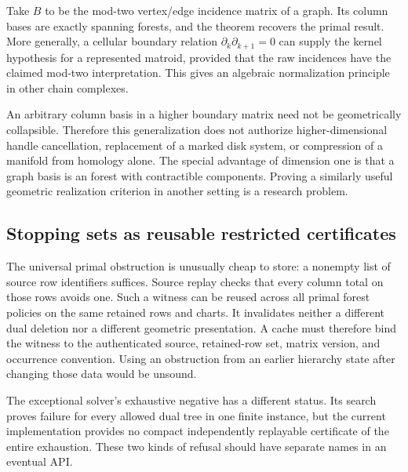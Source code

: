 Take $B$ to be the mod-two vertex/edge incidence matrix of a graph.  Its
column bases are exactly spanning forests, and the theorem recovers the
primal result.  More generally, a cellular boundary relation
$\partial_k\partial_{k+1}=0$ can supply the kernel hypothesis for a
represented matroid, provided that the raw incidences have the claimed
mod-two interpretation.  This gives an algebraic normalization principle
in other chain complexes.

An arbitrary column basis in a higher boundary matrix need not be
geometrically collapsible.  Therefore this generalization does not
authorize higher-dimensional handle cancellation, replacement of a
marked disk system, or compression of a manifold from homology alone.
The special advantage of dimension one is that a graph basis is an
forest with contractible components.  Proving a similarly useful geometric
realization criterion in another setting is a research problem.

\subsection{Stopping sets as reusable restricted certificates}

The universal primal obstruction is unusually cheap to store: a nonempty
list of source row identifiers suffices.  Source replay checks that every
column total on those rows avoids one.  Such a witness can be reused
across all primal forest policies on the same retained rows and charts.
It invalidates neither a different dual deletion nor a different
geometric presentation.  A cache must therefore bind the witness to the
authenticated source, retained-row set, matrix version, and occurrence
convention.  Using an obstruction from an earlier hierarchy state after
changing those data would be unsound.

The exceptional solver's exhaustive negative has a different status.
Its search proves failure for every allowed dual tree in one finite
instance, but the current implementation provides no compact
independently replayable certificate of the entire exhaustion.  These
two kinds of refusal should have separate names in an eventual API.
